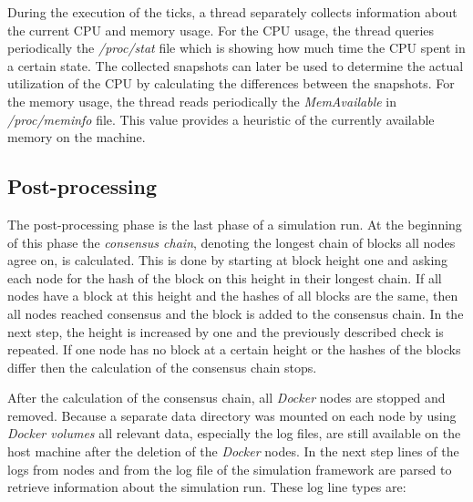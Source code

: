 During the execution of the ticks, a thread separately collects information about the current CPU and memory usage.
For the CPU usage, the thread queries periodically the \textit{/proc/stat} file which is showing how much time the CPU spent in a certain state. 
The collected snapshots can later be used to determine the actual utilization of the CPU by calculating the differences between the snapshots.
For the memory usage, the thread reads periodically the \textit{MemAvailable} in \textit{/proc/meminfo} file.
This value provides a heuristic of the currently available memory on the machine.

\subsection{Post-processing}

The post-processing phase is the last phase of a simulation run.
At the beginning of this phase the \emph{consensus chain}, denoting the longest chain of blocks all nodes agree on, is calculated.
This is done by starting at block height one and asking each node for the hash of the block on this height in their longest chain.
If all nodes have a block at this height and the hashes of all blocks are the same, then all nodes reached consensus and the block is added to the consensus chain.
In the next step, the height is increased by one and the previously described check is repeated.
If one node has no block at a certain height or the hashes of the blocks differ then the calculation of the consensus chain stops.

After the calculation of the consensus chain, all \textit{Docker} nodes are stopped and removed.
Because a separate data directory was mounted on each node by using \textit{Docker volumes} all relevant data, especially the log files, are still available on the host machine after the deletion of the \textit{Docker} nodes.
In the next step lines of the logs from nodes and from the log file of the simulation framework are parsed to retrieve information about the simulation run.
These log line types are:

